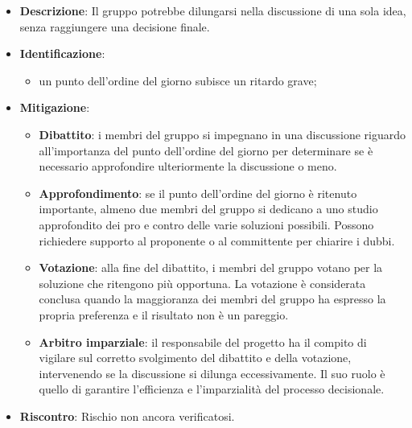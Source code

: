 \label{risk:conflitti decisionali}
\begin{itemize}
	\item \textbf{Descrizione}:
	      Il gruppo potrebbe dilungarsi nella discussione di una sola idea, senza
	      raggiungere una decisione finale.
	\item \textbf{Identificazione}:
	      \begin{itemize}
		      \item un punto dell'ordine del giorno subisce un ritardo grave;
	      \end{itemize}
	\item \textbf{Mitigazione}:
	      \begin{itemize}

		      \item \textbf{Dibattito}: i membri del gruppo si impegnano in una 
			  		discussione riguardo all'importanza del punto dell'ordine del 
					giorno per determinare se è necessario approfondire ulteriormente 
					la discussione o meno.

		      \item \textbf{Approfondimento}: se il punto dell'ordine del giorno è 
			  ritenuto importante, almeno due membri del gruppo si dedicano a uno studio 
			  approfondito dei pro e contro delle varie soluzioni possibili. 
			  Possono richiedere supporto al proponente o al committente per chiarire i dubbi.

		      \item \textbf{Votazione}: alla fine del dibattito, i membri del gruppo 
			  votano per la soluzione che ritengono più opportuna. 
			  La votazione è considerata conclusa quando la maggioranza dei membri 
			  del gruppo ha espresso la propria preferenza e il risultato non è un pareggio.

		      \item \textbf{Arbitro imparziale}: il responsabile del progetto ha il compito 
			  di vigilare sul corretto svolgimento del dibattito e della votazione, 
			  intervenendo se la discussione si dilunga eccessivamente. 
			  Il suo ruolo è quello di garantire l'efficienza e l'imparzialità del processo decisionale.
	      \end{itemize}
	\item \textbf{Riscontro}: Rischio non ancora verificatosi.
\end{itemize}
